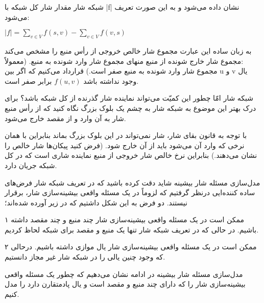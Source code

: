 \begin{itemframe}{شبکه شار}
\itm
مقدار شار کل شبکه با |f| نشان داده می‌شود و به این صورت تعریف می‌شود: \\
\begin{center}
$|f| = \sum_{v \in V} f(s, v) - \sum_{v \in V} f(v, s)$
\end{center}
\itm
به زبان ساده این عبارت مجموع شار خالص خروجی از رأس منبع را مشخص می‌کند :مجموع شار خارج شونده از منبع منهای مجموع شار وارد شونده به منبع. (معمولاً مجموع شار وارد شونده به منبع صفر است.)
\itm
قرارداد می‌کنیم که اگر بین u و v یال وجود نداشته باشد
$f(u, v)$
برابر صفر است.
\end{itemframe}
\begin{itemframe}{شبکه شار}
\itm
امّا چطور این کمیّت می‌تواند نماینده شار گذرنده از کل شبکه باشد؟
\itm
برای درک بهتر این موضوع به شبکه شار به چشم یک بلوک بزرگ نگاه کنید که از رأس منبع شار به آن وارد و از مقصد خارج می‌شود.

\itm
با توجه به قانون بقای شار، شار نمی‌تواند در این بلوک بزرگ بماند بنابراین با همان نرخی که وارد آن می‌شود باید از آن خارج شود. (فرض کنید پیکان‌ها شار خالص را نشان می‌دهند.)‌
\itm
بنابراین نرخ خالص شار خروجی از منبع نماینده شاری است که در کل شبکه جریان دارد.
\end{itemframe}


\begin{itemframe}{مدل‌سازی مسئله شار بیشینه}
\itm
شاید دقت کرده باشید که در تعریف شبکه شار فرض‌های ساده کننده‌ایی درنظر گرفتیم که لزوماً در یک مسئله واقعی بیشینه‌سازی شار، برقرار نیستند. دو فرض به این شکل داشتیم که در زیر آورده شده‌اند؛
\item[۱]
ممکن است در یک مسئله واقعی بیشینه‌سازی شار چند منبع و چند مقصد داشته باشیم. در حالی که در تعریف شبکه شار تنها یک منبع و مقصد برای شبکه لحاظ کردیم.
\item[۲]
ممکن است در یک مسئله واقعی بیشینه‌سازی شار یال موازی داشته باشیم. درحالی که وجود چنین یالی را در شبکه شار غیر مجاز دانستیم.
\end{itemframe}

\begin{itemframe}{مدل‌سازی مسئله شار بیشینه}
\itm
در ادامه نشان می‌دهیم که چطور یک مسئله واقعی بیشینه‌سازی شار را که دارای چند منبع و مقصد است و یال پادمتقارن دارد را مدل کنیم.

\end{itemframe}

